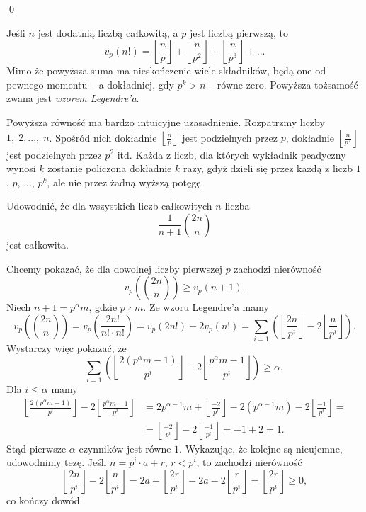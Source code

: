 \qed


\noindent
Jeśli $n$ jest dodatnią liczbą całkowitą, a $p$ jest liczbą pierwszą, to
\[
	v_p(n!) = \left\lfloor \frac{n}{p} \right\rfloor + \left\lfloor \frac{n}{p^2} \right\rfloor + \left\lfloor \frac{n}{p^3} \right\rfloor + ...
\]
Mimo że powyższa suma ma nieskończenie wiele składników, będą one od pewnego momentu -- a dokładniej, gdy $p^k > n$ -- równe zero. Powyższa tożsamość zwana jest \textit{wzorem Legendre'a}.

\vspace{10px}

\noindent
Powyższa równość ma bardzo intuicyjne uzasadnienie. Rozpatrzmy liczby $1, \; 2, ...,  \; n$. Spośród nich dokładnie $\left\lfloor \frac{n}{p} \right\rfloor$ jest podzielnych przez $p$, dokładnie $\left\lfloor \frac{n}{p^2} \right\rfloor$ jest podzielnych przez $p^2$ itd. Każda z liczb, dla których wykładnik peadyczny wynosi $k$ zostanie policzona dokładnie $k$ razy, gdyż dzieli się przez każdą z liczb $1$, $p$, ..., $p^k$, ale nie przez żadną wyższą potęgę.

\vspace{10px}


\noindent
Udowodnić, że dla wszystkich liczb całkowitych $n$ liczba 
\[
	\frac{1}{n+1}{{2n}\choose{n}}
\]
jest całkowita.

\vspace{5px}


\noindent
Chcemy pokazać, że dla dowolnej liczby pierwszej $p$ zachodzi nierówność
\[
	v_p\left({2n}\choose{n} \right) \geqslant v_p(n + 1).
\]
Niech $n + 1 = p^{\alpha}m$, gdzie $p \nmid m$.
Ze wzoru Legendre'a mamy
\[
	v_p\left({2n}\choose{n} \right) = v_p\left(\frac{2n!}{n! \cdot n!} \right) = v_p\left(2n! \right) - 2v_p\left(n! \right) =  \sum_{i = 1} \left(\left\lfloor \frac{2n}{p^i} \right\rfloor - 2\left\lfloor \frac{n}{p^i} \right\rfloor \right).
\]
Wystarczy więc pokazać, że
\[
	\sum_{i = 1} \left(\left\lfloor \frac{2(p^{\alpha}m - 1)}{p^i} \right\rfloor - 2\left\lfloor \frac{p^{\alpha}m - 1}{p^i} \right\rfloor \right) \geqslant \alpha,
\]
Dla $i \leqslant \alpha$ mamy
\begin{align*}
	\left\lfloor \frac{2(p^{\alpha}m - 1)}{p^i} \right\rfloor - 2\left\lfloor \frac{p^{\alpha}m - 1}{p^i} \right\rfloor &= 2p^{\alpha - 1}m + \left\lfloor \frac{-2}{p^i} \right\rfloor - 2\left(p^{\alpha - 1}m \right) -2\left\lfloor \frac{- 1}{p^i} \right\rfloor = \\
	&= \left\lfloor \frac{-2}{p^i} \right\rfloor - 2\left\lfloor \frac{- 1}{p^i} \right\rfloor = -1 + 2 = 1.
\end{align*}
Stąd pierwsze $\alpha$ czynników jest równe $1$. Wykazując, że kolejne są nieujemne, udowodnimy tezę. Jeśli $n = p^i\cdot a + r$, $r < p^i$, to zachodzi nierówność
\[
	\left\lfloor \frac{2n}{p^i} \right\rfloor - 2\left\lfloor \frac{n}{p^i} \right\rfloor = 2a + \left\lfloor  \frac{2r}{p^i} \right\rfloor - 2a - 2\left\lfloor \frac{r}{p^i} \right\rfloor = \left\lfloor  \frac{2r}{p^i} \right\rfloor \geqslant 0,
\]
co kończy dowód.
